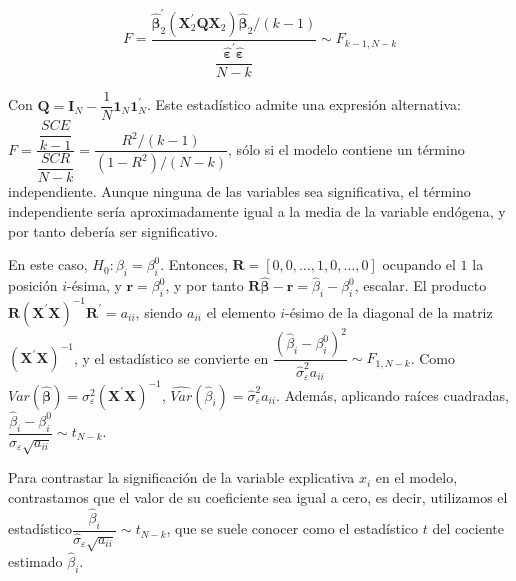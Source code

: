 \begin{equation*}
F=\dfrac{\hat{\boldsymbol{\beta}}^{\prime}_{2}\left(\boldsymbol{X}^{\prime}_{2}\boldsymbol{Q}\boldsymbol{X}_{2}\right)\hat{\boldsymbol{\beta}}_{2}/\left(k-1\right)}{\dfrac{\hat{\boldsymbol{\varepsilon}}^{\prime}\hat{\boldsymbol{\varepsilon}}}{N-k}}\sim F_{k-1,N-k}
\end{equation*}


Con $\boldsymbol{Q}=\boldsymbol{I}_{N}-\dfrac{1}{N}\boldsymbol{1}_{N}\boldsymbol{1}^{\prime}_{N}$.
Este estad\'istico admite una expresi\'on alternativa: $F=\dfrac{\dfrac{SCE}{k-1}}{\dfrac{SCR}{N-k}}=\dfrac{R^{2}/\left(k-1\right)}{\left(1-R^{2}\right)/\left(N-k\right)}$,
s\'olo si el modelo contiene un t\'ermino independiente. Aunque ninguna
de las variables sea significativa, el t\'ermino independiente ser\'ia
aproximadamente igual a la media de la variable end\'ogena, y por tanto
deber\'ia ser significativo.


En este caso, $H_{0}:\beta_{i}=\beta_{i}^{0}$. Entonces, $\boldsymbol{R}=\left[0,0,\ldots,1,0,\ldots,0\right]$
ocupando el $1$ la posici\'on $i$-\'esima, y $\boldsymbol{r}=\beta_{i}^{0}$,
y por tanto $\boldsymbol{R}\hat{\boldsymbol{\beta}}-\boldsymbol{r}=\hat{\beta}_{i}-\beta_{i}^{0}$,
escalar. El producto $\boldsymbol{R}\left(\boldsymbol{X}^{\prime}\boldsymbol{X}\right)^{-1}\boldsymbol{R}^{\prime}=a_{ii}$,
siendo $a_{ii}$ el elemento $i$-\'esimo de la diagonal de la matriz
$\left(\boldsymbol{X}^{\prime}\boldsymbol{X}\right)^{-1}$, y el estad\'istico
se convierte en $\dfrac{\left(\hat{\beta}_{i}-\beta_{i}^{0}\right)^{2}}{\hat{\sigma}_{\varepsilon}^{2}a_{ii}}\sim F_{1,N-k}$.
Como $Var(\hat{\boldsymbol{\beta}})=\sigma_{\varepsilon}^{2}\left(\boldsymbol{X}^{\prime}\boldsymbol{X}\right)^{-1}$,
$\hat{Var}(\hat{\beta}_{i})=\hat{\sigma}_{\varepsilon}^{2}a_{ii}$. Adem\'as,
aplicando ra\'ices cuadradas, $\dfrac{\hat{\beta}_{i}-\beta_{i}^{0}}{\hat{\sigma}_{\varepsilon}\sqrt{a_{ii}}}\sim t_{N-k}$.

Para contrastar la significaci\'on de la variable explicativa $x_{i}$
en el modelo, contrastamos que el valor de su coeficiente sea igual
a cero, es decir, utilizamos el estad\'istico$\dfrac{\hat{\beta}_{i}}{\hat{\sigma}_{\varepsilon}\sqrt{a_{ii}}}\sim t_{N-k}$,
que se suele conocer como el estad\'istico $t$ del cociente estimado
$\hat{\beta}_{i}$.



